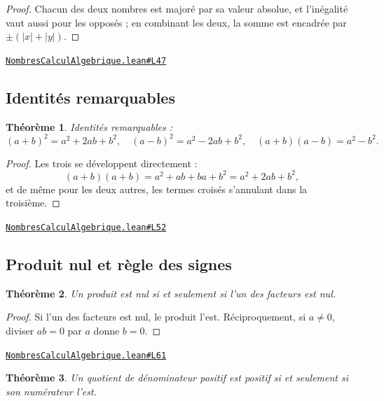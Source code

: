 \documentclass[11pt,a4paper]{article}
\theoremstyle{definition}
\theoremstyle{plain}
\newtheorem{theoreme}{Théorème}
\newcommand{\source}[2]{\par\smallskip\noindent\hfill{\footnotesize\href{#1}{\texttt{#2}}}\par\smallskip}
\begin{document}
\begin{proof}
Chacun des deux nombres est majoré par sa valeur absolue, et l'inégalité vaut aussi
pour les opposés ; en combinant les deux, la somme est encadrée par
$\pm(|x| + |y|)$.
\end{proof}
\source{https://github.com/Commutator-IO/learn-lean/blob/main/cours/02-lycee/01-nombres-calcul-algebrique/NombresCalculAlgebrique.lean\#L47}{NombresCalculAlgebrique.lean\#L47}

\subsection{Identités remarquables}

\begin{theoreme}
Identités remarquables :
\[ (a+b)^2 = a^2 + 2ab + b^2, \quad (a-b)^2 = a^2 - 2ab + b^2, \quad
   (a+b)(a-b) = a^2 - b^2 . \]
\end{theoreme}

\begin{proof}
Les trois se développent directement :
\[ (a+b)(a+b) = a^2 + ab + ba + b^2 = a^2 + 2ab + b^2 , \]
et de même pour les deux autres, les termes croisés s'annulant dans la troisième.
\end{proof}
\source{https://github.com/Commutator-IO/learn-lean/blob/main/cours/02-lycee/01-nombres-calcul-algebrique/NombresCalculAlgebrique.lean\#L52}{NombresCalculAlgebrique.lean\#L52}

\subsection{Produit nul et règle des signes}

\begin{theoreme}
Un produit est nul si et seulement si l'un des facteurs est nul.
\end{theoreme}

\begin{proof}
Si l'un des facteurs est nul, le produit l'est. Réciproquement, si $a \ne 0$, diviser
$ab = 0$ par $a$ donne $b = 0$.
\end{proof}
\source{https://github.com/Commutator-IO/learn-lean/blob/main/cours/02-lycee/01-nombres-calcul-algebrique/NombresCalculAlgebrique.lean\#L61}{NombresCalculAlgebrique.lean\#L61}

\begin{theoreme}
Un quotient de dénominateur positif est positif si et seulement si son numérateur
l'est.
\end{theoreme}
\end{document}
